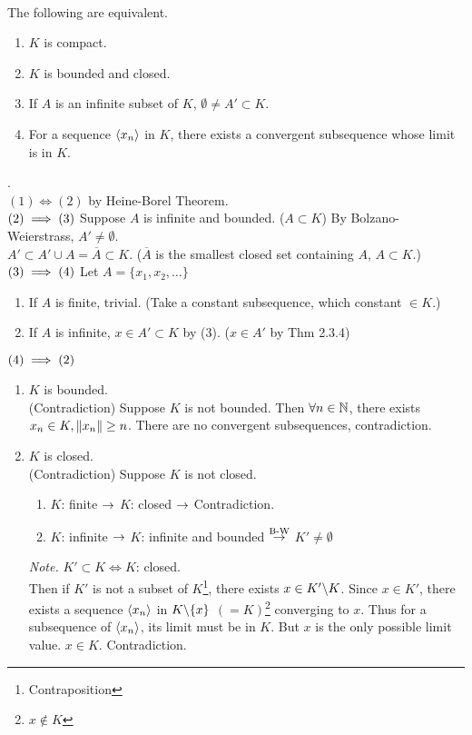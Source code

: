 \pagebreak~\\
 The following are equivalent.
\begin{enumerate}
	\item $K$ is compact.
	\item $K$ is bounded and closed.
	\item If $A$ is an infinite subset of $K$, $\emptyset \neq A'\subset K$.
	\item For a sequence $\left\langle x_n \right\rangle$ in $K$, there exists a convergent subsequence whose limit is in $K$.
\end{enumerate}
\pf. \\
$(1) \iff (2)$ by Heine-Borel Theorem.\\
$(2) \implies (3)$ Suppose $A$ is infinite and bounded. ($A\subset K$) By Bolzano-Weierstrass, $A'\neq \emptyset$.\\
$A'\subset A'\cup A = \overline{A}\subset K$. ($\overline{A}$ is the smallest closed set containing $A$, $A\subset K$.)\\
$(3) \implies (4)$ Let $A = \{x_1, x_2, \dots \}$
\begin{enumerate}
	\item If $A$ is finite, trivial. (Take a constant subsequence, which constant $\in K$.)
	\item If $A$ is infinite, $x\in A'\subset K$ by (3). ($x\in A'$ by Thm 2.3.4)
\end{enumerate}
$(4)\implies (2)$
\begin{enumerate}
	\item $K$ is bounded.\\
	(Contradiction) Suppose $K$ is not bounded. Then $\forall n\in \mathbb{N}$, there exists $x_n\in K, \left\lVert x_n\right\rVert\geq n$. There are no convergent subsequences, contradiction.
	\item $K$ is closed.\\
	(Contradiction) Suppose $K$ is not closed.
	\begin{enumerate}
		\item $K$: finite $\rightarrow$ $K$: closed $\rightarrow$ Contradiction.
		\item $K$: infinite $\rightarrow$ $K$: infinite and bounded $\overset{\text{B-W}}{\rightarrow}$ $K'\neq \emptyset$
	\end{enumerate}
	\textit{Note.} $K'\subset K \iff K$: closed.\\
	Then if $K'$ is not a subset of $K$\footnote{Contraposition}, there exists $x\in K'\backslash K$. Since $x\in K'$, there exists a sequence $\left\langle x_n \right\rangle$ in $K\backslash \{x\}$ $(=K)$\footnote{$x\notin K$} converging to $x$. Thus for a subsequence of $\left\langle x_n \right\rangle$, its limit must be in $K$. But $x$ is the only possible limit value. $x\in K$. Contradiction.
\end{enumerate}

\pagebreak
